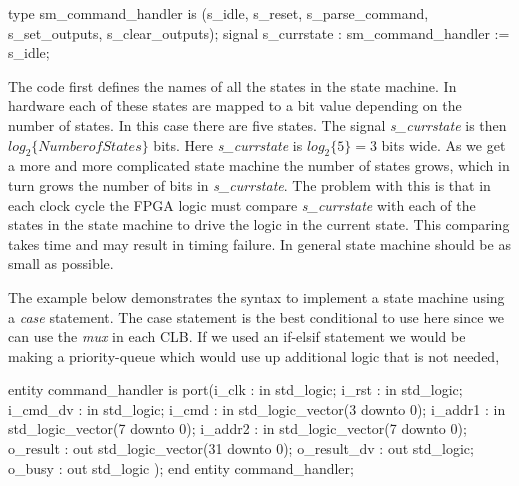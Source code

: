 \begin{VHDLlisting}[tabsize=4]
type sm_command_handler is (s_idle, s_reset, s_parse_command, s_set_outputs, s_clear_outputs);
signal s_currstate : sm_command_handler := s_idle;
\end{VHDLlisting}

The code first defines the names of all the states in the state machine. In hardware each of these states are mapped to a bit value depending on the number of states. In this case there are five states. The signal \emph{s\_currstate} is then $log_2\{{Number of States}\}$ bits. Here \emph{s\_currstate} is $log_2\{5\}=3$ bits wide. As we get a more and more complicated state machine the number of states grows, which in turn grows the number of bits in \emph{s\_currstate}. The problem with this is that in each clock cycle the \ac{FPGA} logic must compare \emph{s\_currstate} with each of the states in the state machine to drive the logic in the current state. This comparing takes time and may result in timing failure. In general state machine should be as small as possible.

The example below demonstrates the syntax to implement a state machine using a \emph{case} statement. The case statement is the best conditional to use here since we can use the \emph{mux} in each \ac{CLB}. If we used an if-elsif statement we would be making a priority-queue which would use up additional logic that is not needed,

\begin{VHDLlisting}[tabsize=4]
entity command_handler is
port(i_clk       : in    std_logic;
     i_rst       : in    std_logic;
     i_cmd_dv    : in    std_logic;
     i_cmd       : in    std_logic_vector(3 downto 0);
     i_addr1     : in    std_logic_vector(7 downto 0);
     i_addr2     : in    std_logic_vector(7 downto 0);
     o_result    :   out std_logic_vector(31 downto 0);
     o_result_dv :   out std_logic;
     o_busy      :   out std_logic
);
end entity command_handler;
\end{VHDLlisting}


